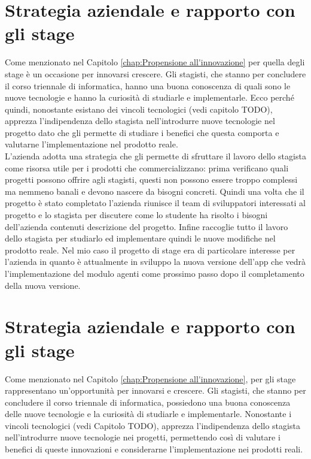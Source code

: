 \section{Strategia aziendale e rapporto con gli stage}
Come menzionato nel Capitolo \ref{chap:Propensione all'innovazione} per {\company} quella degli stage è un occasione 
per innovarsi crescere. Gli stagisti, che stanno per concludere il corso triennale di informatica, hanno una 
buona conoscenza di quali sono le nuove tecnologie e hanno la curiosità di studiarle e implementarle.
Ecco perché quindi, nonostante esistano dei vincoli tecnologici (vedi capitolo TODO), {\company} apprezza 
l'indipendenza dello stagista nell'introdurre nuove tecnologie nel progetto dato che gli permette di studiare i 
benefici che questa comporta e valutarne l'implementazione nel prodotto reale.\\

L'azienda adotta una strategia che gli permette di sfruttare il lavoro dello stagista come risorsa 
utile per i prodotti che commercializzano: prima verificano quali progetti possono offrire agli stagisti, questi 
non possono essere troppo complessi ma nemmeno banali e devono nascere da bisogni concreti. Quindi una volta 
che il progetto è stato completato l'azienda riunisce il team di sviluppatori interessati al progetto 
e lo stagista per discutere come lo studente ha risolto i bisogni dell'azienda contenuti descrizione del progetto.
Infine raccoglie tutto il lavoro dello stagista per studiarlo ed implementare quindi le nuove modifiche nel prodotto 
reale.
Nel mio caso il progetto di stage era di particolare interesse per l'azienda in quanto è attualmente in 
sviluppo la nuova versione dell'app {\movi} che vedrà l'implementazione del modulo agenti come prossimo 
passo dopo il completamento della nuova versione.

\section{Strategia aziendale e rapporto con gli stage}

Come menzionato nel Capitolo \ref{chap:Propensione all'innovazione}, per {\company} gli stage rappresentano 
un'opportunità per innovarsi e crescere. Gli stagisti, che stanno per concludere il corso triennale di 
informatica, possiedono una buona conoscenza delle nuove tecnologie e la curiosità di studiarle e 
implementarle. Nonostante i vincoli tecnologici (vedi Capitolo TODO), {\company} apprezza 
l'indipendenza dello stagista nell'introdurre nuove tecnologie nei progetti, permettendo così di 
valutare i benefici di queste innovazioni e considerarne l'implementazione nei prodotti reali.

